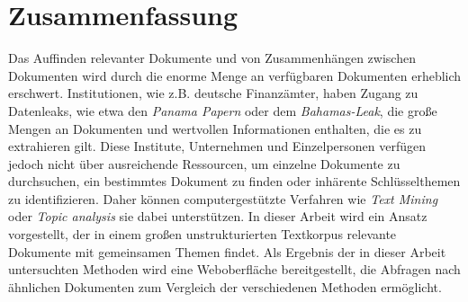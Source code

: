 \chapter*{Zusammenfassung}

Das Auffinden relevanter Dokumente und von Zusammenhängen zwischen Dokumenten wird durch die enorme Menge an verfügbaren Dokumenten erheblich erschwert.
Institutionen, wie z.B. deutsche Finanzämter, haben Zugang zu Datenleaks, wie etwa den \textit{Panama Papern} oder dem \textit{Bahamas-Leak}, 
die große Mengen an Dokumenten und wertvollen Informationen enthalten, die es zu extrahieren gilt.
Diese Institute, Unternehmen und Einzelpersonen verfügen jedoch nicht über ausreichende Ressourcen, um einzelne Dokumente 
zu durchsuchen, ein bestimmtes Dokument zu finden oder inhärente Schlüsselthemen zu identifizieren.
Daher können computergestützte Verfahren wie \textit{Text Mining} oder \textit{Topic analysis} sie dabei unterstützen.
In dieser Arbeit wird ein Ansatz vorgestellt, der in einem großen unstrukturierten Textkorpus relevante Dokumente mit gemeinsamen Themen findet.
Als Ergebnis der in dieser Arbeit untersuchten Methoden wird eine Weboberfläche bereitgestellt, die Abfragen nach ähnlichen Dokumenten 
zum Vergleich der verschiedenen Methoden ermöglicht.
